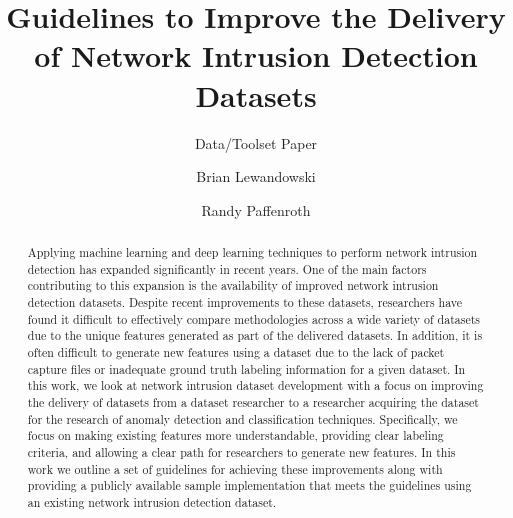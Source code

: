 \documentclass[sigconf]{acmart}
\begin{document}
\title{Guidelines to Improve the Delivery of Network Intrusion Detection Datasets}
\subtitle{Data/Toolset Paper}

\author{Brian Lewandowski}

\author{Randy Paffenroth}

\renewcommand{\shortauthors}{Lewandowski et al.}

\begin{abstract}
    Applying machine learning and deep learning techniques to perform network intrusion detection has expanded significantly in recent years.
    One of the main factors contributing to this expansion is the availability of improved network intrusion detection datasets.
    Despite recent improvements to these datasets, researchers have found it difficult to effectively compare methodologies across a wide variety of datasets due to the unique features generated as part of the delivered datasets.
    In addition, it is often difficult to generate new features using a dataset due to the lack of packet capture files or inadequate ground truth labeling information for a given dataset.
    In this work, we look at network intrusion dataset development with a focus on improving the delivery of datasets from a dataset researcher to a researcher acquiring the dataset for the research of anomaly detection and classification techniques.
    Specifically, we focus on making existing features more understandable, providing clear labeling criteria, and allowing a clear path for researchers to generate new features.
    In this work we outline a set of guidelines for achieving these improvements along with providing a publicly available sample implementation that meets the guidelines using an existing network intrusion detection dataset.
\end{abstract}
\end{document}

